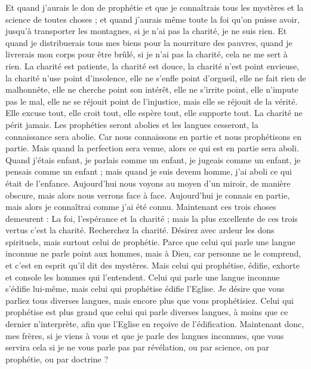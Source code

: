 \begin{multicols}{2}
Et quand j'aurais le don de prophétie et que je connaîtrais tous les mystères et la science de toutes choses ; et quand j'aurais même toute la foi qu'on puisse avoir, jusqu’à transporter les montagnes, si je n'ai pas la charité, je ne suis rien.
Et quand je distribuerais tous mes biens pour la nourriture des pauvres, quand je livrerais mon corps pour être brûlé, si je n'ai pas la charité, cela ne me sert à rien.
La charité est patiente, la charité est douce, la charité n'est point envieuse, la charité n'use point d'insolence, elle ne s’enfle point d’orgueil,
elle ne fait rien de malhonnête, elle ne cherche point son intérêt, elle ne s’irrite point, elle n’impute pas le mal,
elle ne se réjouit point de l'injustice, mais elle se réjouit de la vérité.
Elle excuse tout, elle croit tout, elle espère tout, elle supporte tout.
La charité ne périt jamais. Les prophéties seront abolies et les langues cesseront, la connaissance sera abolie.
Car nous connaissons en partie et nous prophétisons en partie.
Mais quand la perfection sera venue, alors ce qui est en partie sera aboli.
Quand j'étais enfant, je parlais comme un enfant, je jugeais comme un enfant, je pensais comme un enfant ; mais quand je suis devenu homme, j'ai aboli ce qui était de l'enfance.
Aujourd’hui nous voyons au moyen d’un miroir, de manière obscure, mais alors nous verrons face à face. Aujourd’hui je connais en partie, mais alors je connaîtrai comme j'ai été connu.
Maintenant ces trois choses demeurent : La foi, l'espérance et la charité ; mais la plus excellente de ces trois vertus c'est la charité.
\VerseOne{}Recherchez la charité. Désirez avec ardeur les dons spirituels, mais surtout celui de prophétie.
Parce que celui qui parle une langue inconnue ne parle point aux hommes, mais à Dieu, car personne ne le comprend, et c’est en esprit qu’il dit des mystères.
Mais celui qui prophétise, édifie, exhorte et console les hommes qui l'entendent.
Celui qui parle une langue inconnue s'édifie lui-même, mais celui qui prophétise édifie l'Eglise.
Je désire que vous parliez tous diverses langues, mais encore plus que vous prophétisiez. Celui qui prophétise est plus grand que celui qui parle diverses langues, à moins que ce dernier n’interprète, afin que l'Eglise en reçoive de l'édification.
Maintenant donc, mes frères, si je viens à vous et que je parle des langues inconnues, que vous servira cela si je ne vous parle pas par révélation, ou par science, ou par prophétie, ou par doctrine ?

\end{multicols}
